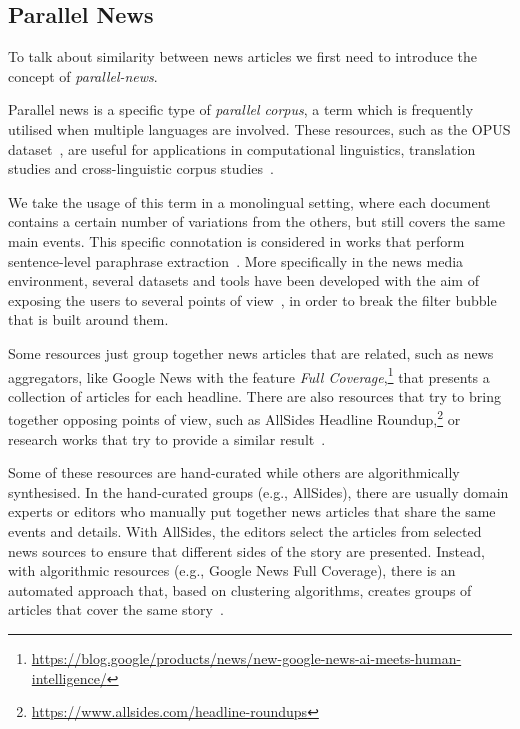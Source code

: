 \subsection{\statusgreen Parallel News}
\label{ssec:lit_relationships_parallel}

To talk about similarity between news articles we first need to introduce the concept of \emph{\gls{parallel-news}}.

Parallel news is a specific type of \emph{parallel corpus}, a term which is frequently utilised when multiple languages are involved.
These resources, such as the OPUS dataset~\citep{tiedemann2012parallel}, are useful for applications in computational linguistics, translation studies and cross-linguistic corpus studies~\citep{brown1991aligning,ramesh2022samanantar,ziemski2016united,kunchukuttan2017iit,banon2020paracrawl}.

We take the usage of this term in a monolingual setting, where each document contains a certain number of variations from the others, but still covers the same main events.
This specific connotation is considered in works that perform sentence-level paraphrase extraction~\citep{dolan2004unsupervised,zhang2013harvesting}.
More specifically in the news media environment, several datasets and tools have been developed with the aim of exposing the users to several points of view~\citep{bozdag2015breaking}, in order to break the filter bubble~\citep{pariser2011filter} that is built around them.

Some resources just group together news articles that are related, such as news aggregators, like Google News with the feature \emph{Full Coverage},\footnote{\url{https://blog.google/products/news/new-google-news-ai-meets-human-intelligence/}} that presents a collection of articles for each headline.
There are also resources that try to bring together opposing points of view, such as AllSides Headline Roundup,\footnote{\url{https://www.allsides.com/headline-roundups}} or research works that try to provide a similar result~\citep{trampuvs2015diversinews,park2009newscube}.



Some of these resources are hand-curated while others are algorithmically synthesised. In the hand-curated groups (e.g., AllSides), there are usually domain experts or editors who manually put together news articles that share the same events and details. With AllSides, the editors select the articles from selected news sources to ensure that different sides of the story are presented.
Instead, with algorithmic resources (e.g., Google News Full Coverage), there is an automated approach that, based on clustering algorithms, creates groups of articles that cover the same story~\citep{marutho2018determination,alelyani2018feature,karimi2018news}.

